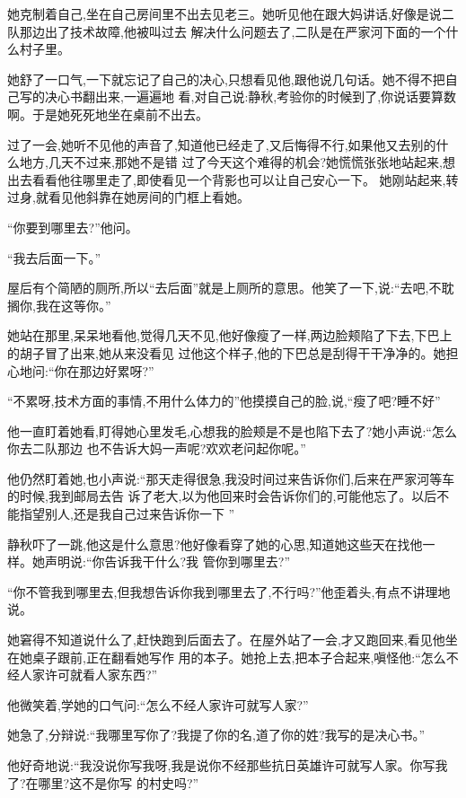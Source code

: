 ﻿\documentclass[12pt]{article}
\begin{document}
她克制着自己,坐在自己房间里不出去见老三。她听见他在跟大妈讲话,好像是说二队那边出了技术故障,他被叫过去
解决什么问题去了,二队是在严家河下面的一个什么村子里。

她舒了一口气,一下就忘记了自己的决心,只想看见他,跟他说几句话。她不得不把自己写的决心书翻出来,一遍遍地
看,对自己说:静秋,考验你的时候到了,你说话要算数啊。于是她死死地坐在桌前不出去。

过了一会,她听不见他的声音了,知道他已经走了,又后悔得不行,如果他又去别的什么地方,几天不过来,那她不是错
过了今天这个难得的机会?她慌慌张张地站起来,想出去看看他往哪里走了,即使看见一个背影也可以让自己安心一下。
她刚站起来,转过身,就看见他斜靠在她房间的门框上看她。

``你\myrule 要到哪里去?''他问。

``我去\myrule 后面一下。''

屋后有个简陋的厕所,所以``去后面''就是上厕所的意思。他笑了一下,说:``去吧,不耽搁你,我在这等你。''

她站在那里,呆呆地看他,觉得几天不见,他好像瘦了一样,两边脸颊陷了下去,下巴上的胡子冒了出来,她从来没看见
过他这个样子,他的下巴总是刮得干干净净的。她担心地问:``你在那边\myrule 好累呀?''

``不累呀,技术方面的事情,不用什么体力的\myrule ''他摸摸自己的脸,说,``瘦了吧?睡不好\myrule ''

他一直盯着她看,盯得她心里发毛,心想我的脸颊是不是也陷下去了?她小声说:``怎么你去\myrule 二队那边
\myrule 也不告诉\myrule 大妈一声呢?欢欢老问起你呢。''

他仍然盯着她,也小声说:``那天走得很急,我没时间过来告诉你\myrule 们,后来在严家河等车的时候,我到邮局去告
诉了老大,以为他回来时会告诉你们的,可能他忘了\myrule 。以后不能指望别人,还是我自己过来告诉你一下
\myrule ''

静秋吓了一跳,他这是什么意思?他好像看穿了她的心思,知道她这些天在找他一样。她声明说:``你告诉我干什么?我
管你\myrule 到哪里去?''

``你不管我到哪里去,但我想告诉你我到哪里去了,不行吗?''他歪着头,有点不讲理地说。

她窘得不知道说什么了,赶快跑到后面去了。在屋外站了一会,才又跑回来,看见他坐在她桌子跟前,正在翻看她写作
用的本子。她抢上去,把本子合起来,嗔怪他:``怎么不经人家许可就看人家东西?''

他微笑着,学她的口气问:``怎么不经人家许可就写人家?''

她急了,分辩说:``我哪里写你了?我提了你的名,道了你的姓?我写的是\myrule 决心书。''

他好奇地说:``我没说你写我呀,我是说你不经那些抗日英雄许可就写人家\myrule 。你写我了?在哪里?这不是你写
的村史吗?''
\end{document}
